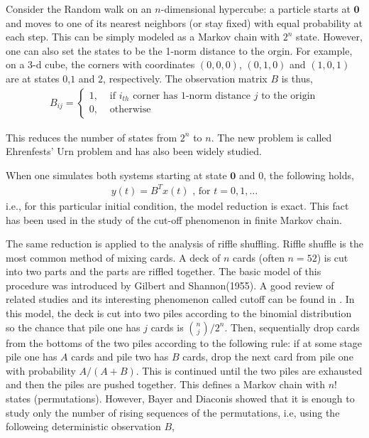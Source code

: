 \documentclass{article}
\begin{document}
Consider the Random walk on an $n$-dimensional hypercube: a particle starts at $\mathbf{0}$ and moves to one of its nearest neighbors (or stay fixed) with equal probability at each step. This can be simply modeled as a Markov chain with $2^n$ state\cite{Diaconis1990}. However, one can also set the states to be the 1-norm distance to the orgin. For example, on a 3-d cube, the corners with coordinates $(0,0,0)$, $(0,1,0)$ and $(1,0,1)$ are at states $0$,$1$ and $2$, respectively. The observation matrix $B$ is thus,
\begin{eqnarray}
B_{ij} = \left\{ \begin{array}{cc}
                 1,&\mbox{ if } i_{th} \mbox{ corner has 1-norm distance } j \mbox{ to the origin}\\
                 0,&\mbox{ otherwise}
                 \end{array} \right.
\end{eqnarray}



This reduces the number of states from $2^n$ to $n$. The new problem is called Ehrenfests' Urn problem and has also been widely studied. 

When one simulates both systems starting at state $\mathbf{0}$ and $0$, the following holds,
\begin{eqnarray}
y(t) = B^T x(t) \mbox{  , for } t={0,1,...} 
\end{eqnarray} 
i.e., for this particular initial condition, the model reduction is exact. This fact has been used in the study of the cut-off phenomenon in finite Markov chain. 

The same reduction is applied to the analysis of riffle shuffling. Riffle shuffle is the most common method of mixing cards. A deck of $n$ cards (often $n=52$) is cut into two parts and the parts are riffled together. The basic model of this procedure was introduced by Gilbert and Shannon(1955)\cite{Gilbert1955}. A good review of related studies and its interesting phenomenon called cutoff can be found in \cite{Diaconis2001}. In this model, the deck is cut into two piles according to the binomial distribution so the chance that pile one has $j$ cards is ${n \choose j}/2^n$. Then, sequentially drop cards from the bottoms of the two piles according to the following rule: if at some stage pile one has $A$ cards and pile two has $B$ cards, drop the next card from pile one with probability $A/(A+B)$. This is continued until the two piles are exhausted and then the piles are pushed together. This defines a Markov chain with $n!$ states (permutations). However, Bayer and Diaconis\cite{Diaconis1992} showed that it is enough to study only the number of rising sequences of the permutations, i.e, using the followeing deterministic observation $B$,
\end{document}
